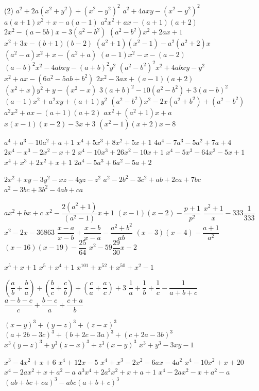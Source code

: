		\begin{tasks}[label = \arabic*.,label-width = 1.5em](2) %
			\task $a^2+2a(x^2+y^2)+(x^2-y^2)^2$
			\task $a^2+4axy-(x^2-y^2)^2$
			\task $a(a+1)x^2+x-a(a-1)$
			\task $a^2x^2+ax-(a+1)(a+2)$
			\task $2x^2-(a-5b)x-3(a^2-b^2)$
			\task $(a^2-b^2)x^2+2ax+1$
			\task $x^2+3x-(b+1)(b-2)$
			\task $(a^2+1)(x^2-1)-a^2(a^2+2)x$
			\task $(a^2-a)x^2+x-(a^2+a)$
			\task $(a-1)x^2-x-(a-2)$
			\task $(a-b)^2x^2-4abxy-(a+b)^2y^2$
			\task $(a^2-b^2)^2x^2+4abxy-y^2$
			\task $x^2+ax-(6a^2-5ab+b^2)$
			\task $2x^2-3ax+(a-1)(a+2)$
			\task $(x^2+x)y^2+y-(x^2-x)$
			\task $3(a+b)^2-10(a^2-b^2)+3(a-b)^2$
			\task $(a-1)x^2+a^2xy+(a+1)y^2$
			\task $(a^2-b^2)x^2-2x(a^2+b^2)+(a^2-b^2)$
			\task $a^2x^2+ax-(a+1)(a+2)$
			\task $ax^2+(a^2+1)x+a$
			\task $x(x-1)(x-2)-3x+3$
			\task $(x^2-1)(x+2)x-8$


			\task $a^4+a^3-10a^2+a+1$
			\task $x^4+5x^3+8x^2+5x+1$
			\task $4a^4-7a^3-5a^2+7a+4$
			\task $2x^4-x^3-2x^2-x+2$
			\task $x^4-10x^3+26x^2-10x+1$
			\task $x^4-5x^3-64x^2-5x+1$
			\task $x^4+x^3+2x^2+x+1$
			\task $2a^4-5a^3+6a^2-5a+2$

			\task $2x^2+xy-3y^2-xz-4yz-z^2$
			\task $a^2-2b^2-3c^2+ab+2ca+7bc$
			\task $a^2-3bc+3b^2-4ab+ca$



			\task $ax^2+bx+c$
			\task $x^2-\dfrac{2(a^2+1)}{(a^2-1)}x+1$
			\task $(x-1)(x-2)-\dfrac{p+1}{p^2}$
			\task $\dfrac{x^2+1}{x}-333\dfrac{1}{333}$
			\task $x^2-2x-36863$
			\task $\dfrac{x-a}{x-b}+\dfrac{x-b}{x-a}-\dfrac{a^2+b^2}{ab}$
			\task $(x-3)(x-4)-\dfrac{a+1}{a^2}$
			\task $(x-16)(x-19)-\dfrac{25}{64}$
			\task $x^2-59\dfrac{29}{30}x-2$


			\task $x^5+x+1$ %
			\task $x^5+x^4+1$ %
			\task $x^{101}+x^{52}+x^{50}+x^2-1$ %


			\task $\left(\dfrac{a}{b}+\dfrac{b}{a}\right)+\left(\dfrac{b}{c}+\dfrac{c}{b}\right)+\left(\dfrac{c}{a}+\dfrac{a}{c}\right)+3$
			\task $\dfrac{1}{a}+\dfrac{1}{b}+\dfrac{1}{c}-\dfrac{1}{a+b+c}$
			\task $\dfrac{a-b-c}{c}+\dfrac{b-c}{a}+\dfrac{c+a}{b}$
			
			\task $(x-y)^3+(y-z)^3+(z-x)^3$
			\task $(a+2b-3c)^3+(b+2c-3a)^3+(c+2a-3b)^3$
			\task $x^3(y-z)^3+y^3(z-x)^3+z^3(x-y)^3$
			\task $x^3+y^3-3xy-1$


			\task $x^3-4x^2+x+6$
			\task $x^4+12x-5$
			\task $x^4+x^3-2x^2-6ax-4a^2$ %
			\task $x^4-10x^2+x+20$
			\task $x^4-2ax^2+x+a^2-a$
			\task $a^3x^4+2a^2x^2+x+a+1$
			\task $x^4-2ax^2-x+a^2-a$
			\task $(ab+bc+ca)^3-abc(a+b+c)^3$



		\end{tasks}
